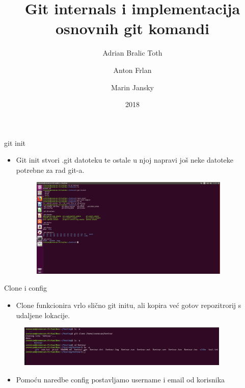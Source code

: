 \documentclass{beamer}
\title{Git internals i implementacija osnovnih git komandi}
\author{Adrian Bralic Toth \and Anton Frlan \and Marin Jansky}
\institute{Tehnički Fakultet Rijeka}
\date{2018}
\begin{document}
\frame{\titlepage}



\begin{frame}{git init}

\begin{itemize}
	\setlength\itemsep{2em}
	\item Git init stvori .git datoteku te ostale u njoj napravi još neke datoteke potrebne za rad git-a.
	\begin{figure}
\centering
\includegraphics[width=0.9\textwidth]{./slike/git_datoteka.png}
\end{figure}
\end{itemize}

\end{frame}

\begin{frame}{Clone i config}

\begin{itemize}
	\item Clone funkcionira vrlo slično git initu, ali kopira već gotov repozitrorij s udaljene lokacije.
\end{itemize}
	\begin{figure}
		\includegraphics[width=0.9\textwidth]{./slike/b.png}
	\end{figure}
\begin{itemize}
	\item Pomoću naredbe config postavljamo username i email od korisnika
\end{itemize}

\end{frame}
\end{document}
